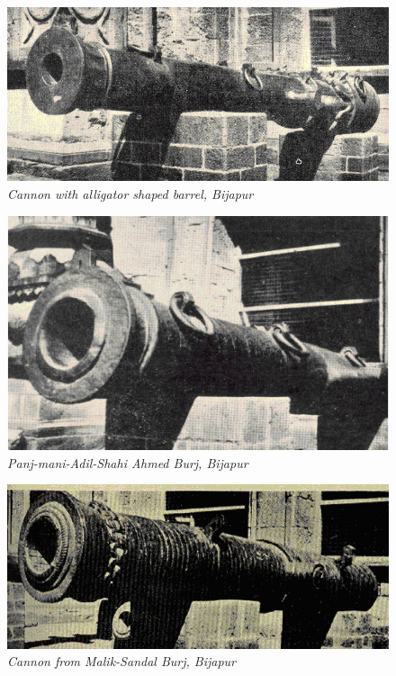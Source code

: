 \vspace{-.6cm}

\begin{figure}[H]
\includegraphics[scale=4.1]{images/chapter-5/Fig35.jpg}

\vspace{-.2cm}

\caption{\textit{Cannon with alligator shaped barrel, Bijapur}}\label{chapter-5-fig35}
\end{figure}

\vspace{-.3cm}

\begin{figure}[H]
\includegraphics[scale=2]{images/chapter-5/Fig36.jpg}
\caption{\textit{Panj-mani-Adil-Shahi Ahmed Burj, Bijapur}}\label{chapter-5-fig36}
\end{figure}



\begin{figure}[H]
\includegraphics[scale=2.5]{images/chapter-5/Fig37.jpg}
\caption{\textit{Cannon from Malik-Sandal Burj, Bijapur}}\label{chapter-5-fig37}
\end{figure}

